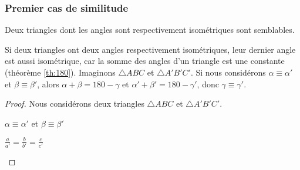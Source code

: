\documentclass[a4paper,12pt]{article}
\begin{document}
\subsubsection{Premier cas de similitude}
\begin{theorem}
Deux triangles dont les angles sont respectivement isométriques sont semblables.
\end{theorem}

\begin{remark}
Si deux triangles ont deux angles respectivement isométriques, leur dernier angle est aussi isométrique, car la somme des angles d'un triangle est une constante (théorème \ref{th:180}). Imaginons $\triangle ABC$ et $\triangle A'B'C'$. Si nous considérons $\alpha \equiv \alpha'$ et $\beta \equiv \beta'$, alors $\alpha + \beta = 180 - \gamma$ et $\alpha' + \beta' = 180 - \gamma'$, donc $\gamma \equiv \gamma'$.

\end{remark}


\begin{proof}
Nous considérons deux triangles $\triangle ABC$ et $\triangle A'B'C'$.

\begin{hyp}
$\alpha \equiv \alpha'$ et $\beta \equiv \beta'$
\end{hyp}

\begin{concl}
$\frac{a}{a'} = \frac{b}{b'} = \frac{c}{c'}$
\end{concl}




\end{proof}
\end{document}
